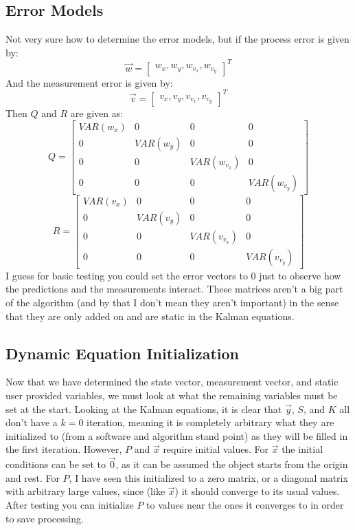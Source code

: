 \documentclass{article} %
\begin{document}
\subsection{Error Models}
Not very sure how to determine the error models, but if the process error is given by:
\begin{equation}
\vec{w} = 
\begin{bmatrix}
 w_x, w_y, w_{v_x}, w_{v_y}
\end{bmatrix}^T
\end{equation}
And the measurement error is given by:
\begin{equation}
\vec{v} = 
\begin{bmatrix}
 v_x, v_y, v_{v_x}, v_{v_y}
\end{bmatrix}^T
\end{equation}
Then $Q$ and $R$ are given as:
\begin{equation}
Q =
\begin{bmatrix}
VAR(w_x) & 0 & 0 & 0 \\
0 & VAR(w_y) & 0 & 0 \\
0 & 0 & VAR(w_{v_x}) & 0 \\
0 & 0 & 0 & VAR(w_{v_y}) 
\end{bmatrix}
\end{equation}
\begin{equation}
R =
\begin{bmatrix}
VAR(v_x) & 0 & 0 & 0 \\
0 & VAR(v_y) & 0 & 0 \\
0 & 0 & VAR(v_{v_x}) & 0 \\
0 & 0 & 0 & VAR(v_{v_y}) 
\end{bmatrix}
\end{equation}
I guess for basic testing you could set the error vectors to 0 just to observe how the predictions and the measurements interact. These matrices aren't a big part of the algorithm (and by that I don't mean they aren't important) in the sense that they are only added on and are static in the Kalman equations.
\subsection{Dynamic Equation Initialization}
Now that we have determined the state vector, measurement vector, and static user provided variables, we must look at what the remaining variables must be set at the start. Looking at the Kalman equations, it is clear that $\vec{y}$, $S$, and $K$ all don't have a $k = 0$ iteration, meaning it is completely arbitrary what they are initialized to (from a software and algorithm stand point) as they will be filled in the first iteration. However, $P$ and $\vec{x}$ require initial values. For $\vec{x}$ the initial conditions can be set to $\vec{0}$, as it can be assumed the object starts from the origin and rest. For $P$, I have seen this initialized to a zero matrix, or a diagonal matrix with arbitrary large values, since (like $\vec{x}$) it should converge to its usual values. After testing you can initialize $P$ to values near the ones it converges to in order to save processing.
\end{document}

